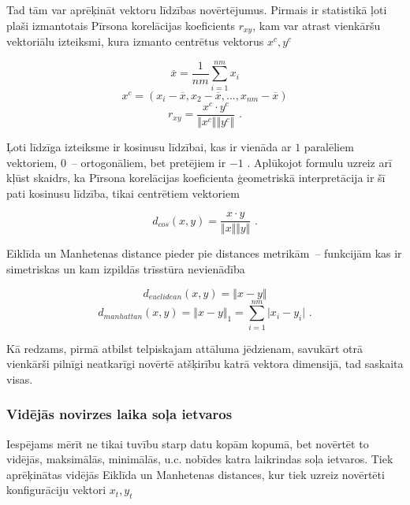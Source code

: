 \documentclass[12pt, a4paper]{article}
\numberwithin{equation}{section} %
\begin{document}
Tad tām var aprēķināt vektoru līdzības novērtējumus. Pirmais ir statistikā ļoti plaši izmantotais Pīrsona korelācijas koeficients $r_{xy}$, kam var atrast vienkāršu vektoriālu izteiksmi, kura izmanto centrētus vektorus $x^c, y^c$ \cite{pearson_vector} 

\begin{equation}
    \overline{x} = \frac{1}{nm} \sum_{i=1}^{nm} x_i
\end{equation}
\begin{equation}
    x^c = (x_i - \overline{x}, x_2 - \overline{x}, ..., x_{nm} - \overline{x})
\end{equation}
\begin{equation}
    r_{xy} = \frac{x^c \cdot y^c}{\Vert x^c \Vert \Vert y^c \Vert}
    \text{ .}
\end{equation}

Ļoti līdzīga izteiksme ir kosinusu līdzībai, kas ir vienāda ar $1$ paralēliem vektoriem, $0$~-- ortogonāliem, bet pretējiem ir $-1$ \cite{cosine_sim}. Aplūkojot formulu uzreiz arī kļūst skaidrs, ka Pīrsona korelācijas koeficienta ģeometriskā interpretācija ir šī pati kosinusu līdzība, tikai centrētiem vektoriem

\begin{equation}
    d_{cos}(x,y) = \frac{x \cdot y}{\Vert x \Vert \Vert y \Vert}
\text{ .}
\end{equation}

Eiklīda un Manhetenas distance pieder pie distances metrikām~-- funkcijām kas ir simetriskas un kam izpildās trīsstūra nevienādība \cite{metrics}

\begin{equation}
    d_{euclidean}(x,y) = \Vert x - y \Vert
\end{equation}
\begin{equation}
    d_{manhattan}(x,y) = \Vert x - y \Vert_1 = \sum_{i=1}^{nm} \vert x_i - y_i \vert
\text{ .}
\end{equation}

Kā redzams, pirmā atbilst telpiskajam attāluma jēdzienam, savukārt otrā vienkārši pilnīgi neatkarīgi novērtē atšķirību katrā vektora dimensijā, tad saskaita visas.

\subsubsection{Vidējās novirzes laika soļa ietvaros}

Iespējams mērīt ne tikai tuvību starp datu kopām kopumā, bet novērtēt to vidējās, maksimālās, minimālās, u.c. nobīdes katra laikrindas soļa ietvaros. Tiek aprēķinātas vidējās Eiklīda un Manhetenas distances, kur tiek uzreiz novērtēti konfigurāciju vektori $x_t, y_t$
\end{document}
